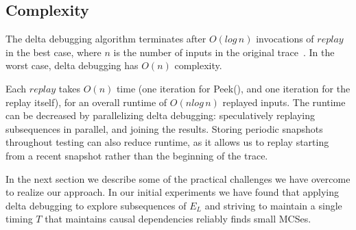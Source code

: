\subsection{Complexity}
\label{subsec:complexity}

The delta debugging algorithm terminates after $O(log\,n)$
invocations of $replay$ in the best case, where $n$ is the number of inputs in the original
trace~\cite{Zeller:1999:YMP:318773.318946}. In the worst case, delta debugging
has $O(n)$ complexity.

Each $replay$ takes $O(n)$ time
(one iteration for Peek(), and one iteration for the replay itself),
for an overall runtime of $O(nlog\,n)$ replayed inputs.
The runtime can be decreased by parallelizing delta debugging:
speculatively replaying subsequences in parallel, and joining the results.
Storing periodic snapshots throughout testing can also reduce runtime, as it
allows us to replay starting from a recent snapshot rather than the beginning of the trace.



In the next section we describe some
of the practical challenges we have overcome to realize our approach.
In our initial experiments we have found that applying delta debugging to explore
subsequences of $E_L$ and striving to maintain a single timing $T$ that maintains
causal dependencies reliably finds small MCSes.
